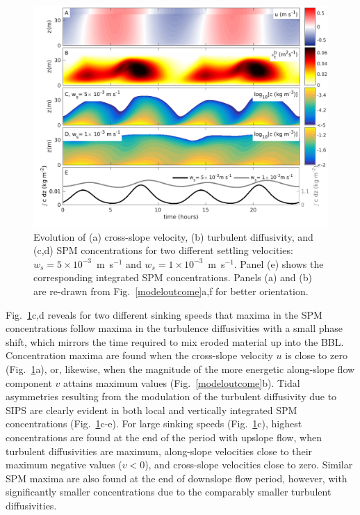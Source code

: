 \begin{figure}[ht]
  \noindent\includegraphics[width=40pc]{divc.png}
  \caption{Evolution of (a) cross-slope velocity, (b) turbulent
    diffusivity, and (c,d) SPM concentrations for two different
    settling velocities: $w_s=5 \times 10^{-3}$~m~s$^{-1}$ and $w_s=1
    \times 10^{-3}$~m~s$^{-1}$. Panel (e) shows the corresponding
    integrated SPM concentrations. Panels (a) and (b) are re-drawn
    from Fig.\ \ref{modeloutcome}a,f for better orientation.}
  \label{wsdifference}
\end{figure}

Fig.\ \ref{wsdifference}c,d reveals for two different sinking speeds
that maxima in the SPM concentrations follow maxima in the turbulence
diffusivities with a small phase shift, which mirrors the time
required to mix eroded material up into the BBL. Concentration maxima
are found when the cross-slope velocity $u$ is close to zero
(Fig.\ \ref{wsdifference}a), or, likewise, when the magnitude of the
more energetic along-slope flow component $v$ attains maximum values
(Fig.\ \ref{modeloutcome}b). Tidal asymmetries resulting from the
modulation of the turbulent diffusivity due to SIPS are clearly
evident in both local and vertically integrated SPM concentrations
(Fig.\ \ref{wsdifference}c-e). For large sinking speeds
(Fig.\ \ref{wsdifference}c), highest concentrations are found at the
end of the period with upslope flow, when turbulent diffusivities are
maximum, along-slope velocities close to their maximum negative values
($v<0$), and cross-slope velocities close to zero. Similar SPM maxima
are also found at the end of downslope flow period, however, with
significantly smaller concentrations due to the comparably smaller
turbulent diffusivities.

